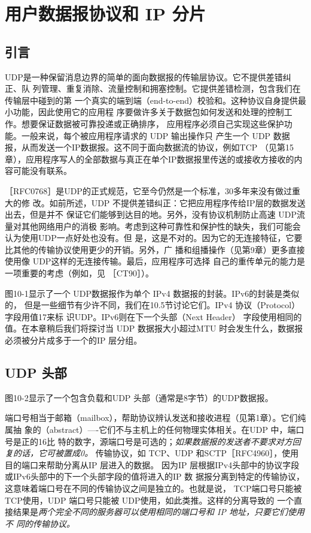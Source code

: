 \chapter{用户数据报协议和 IP 分片}
\minitoc

\section{引言}
UDP是一种保留消息边界的简单的面向数据报的传输层协议。它不提供差错纠正、队
列管理、重复消除、流量控制和拥塞控制。它提供差错检测，包含我们在传输层中碰到的第
一个真实的端到端（end-to-end）校验和。这种协议自身提供最小功能，因此使用它的应用程
序要做许多关于数据包如何发送和处理的控制工作。想要保证数据被可靠投递或正确排序，
应用程序必须自己实现这些保护功能。一般来说，每个被应用程序请求的 UDP 输出操作只
产生一个 UDP 数据报，从而发送一个IP数据报。这不同于面向数据流的协议，例如TCP
（见第15章），应用程序写人的全部数据与真正在单个IP数据报里传送的或接收方接收的内
容可能没有联系。

［RFC0768］是UDP的正式规范，它至今仍然是一个标准，30多年来没有做过重大的修
改。如前所述，UDP 不提供差错纠正：它把应用程序传给IP层的数据发送出去，但是并不
保证它们能够到达目的地。另外，没有协议机制防止高速 UDP流量对其他网络用户的消极
影响。考虑到这种可靠性和保护性的缺失，我们可能会认为使用UDP一点好处也没有。但
是，这是不对的。因为它的无连接特征，它要比其他的传输协议使用更少的开销。另外，广
播和组播操作（见第9章）更多直接使用像 UDP这样的无连接传输。最后，应用程序可选择
自己的重传单元的能力是一项重要的考虑（例如，见 ［CT90］）。

图10-1显示了一个 UDP数据报作为单个 IPv4 数据报的封装。IPv6的封装是类似的，
但是一些细节有少许不同，我们在10.5节讨论它们。IPv4 协议（Protocol）字段用值17来标
识UDP。IPv6则在下一个头部（Next Header） 字段使用相同的值。在本章稍后我们将探讨当
UDP 数据报大小超过MTU 时会发生什么，数据报必须被分片成多于一个的IP 层分组。

\section{UDP 头部}

图10-2显示了一个包含负载和UDP 头部（通常是8字节）的UDP数据报。

端口号相当于邮箱（mailbox），帮助协议辨认发送和接收进程（见第1章）。它们纯属抽
象的（abstract）—-它们不与主机上的任何物理实体相关。在UDP 中，端口号是正的16比
特的数字，源端口号是可选的；\emph{如果数据报的发送者不要求对方回复的话，它可被置成0。}
传输协议，如 TCP、UDP 和SCTP［RFC4960］，使用目的端口来帮助分离从IP 层进入的数据。
因为IP 层根据IPv4头部中的协议字段或IPv6头部中的下一个头部字段的值将进入的IP 数
据报分离到特定的传输协议，这意味着端口号在不同的传输协议之间是独立的。也就是说，
TCP端口号只能被 TCP使用，UDP 端口号只能被 UDP使用，如此类推。这样的分离导致的
一个直接结果是\emph{两个完全不同的服务器可以使用相同的端口号和 IP 地址，只要它们使用不
同的传输协议。}


